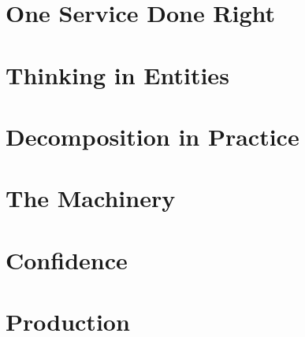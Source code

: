 \documentclass[11pt,a4paper,twoside,openright]{book}
\begin{document}
\frontmatter


\tableofcontents


\mainmatter

\part{One Service Done Right}






\part{Thinking in Entities}






\part{Decomposition in Practice}






\part{The Machinery}




\part{Confidence}



\part{Production}





\end{document}

